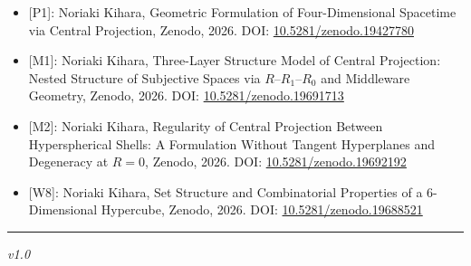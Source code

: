 \documentclass[
  a4paper,11pt]{article}
\providecommand{\tightlist}{%
  \setlength{\itemsep}{0pt}\setlength{\parskip}{0pt}}
\theoremstyle{definition}
\theoremstyle{remark}
\begin{document}
\begin{itemize}
\tightlist
\item
  {[}P1{]}: Noriaki Kihara, Geometric Formulation of Four-Dimensional
  Spacetime via Central Projection, Zenodo, 2026. DOI:
  \href{https://doi.org/10.5281/zenodo.19427780}{10.5281/zenodo.19427780}
\item
  {[}M1{]}: Noriaki Kihara, Three-Layer Structure Model of Central
  Projection: Nested Structure of Subjective Spaces via
  \(R\)--\(R_1\)--\(R_0\) and Middleware Geometry, Zenodo, 2026. DOI:
  \href{https://doi.org/10.5281/zenodo.19691713}{10.5281/zenodo.19691713}
\item
  {[}M2{]}: Noriaki Kihara, Regularity of Central Projection Between
  Hyperspherical Shells: A Formulation Without Tangent Hyperplanes and
  Degeneracy at \(R = 0\), Zenodo, 2026. DOI:
  \href{https://doi.org/10.5281/zenodo.19692192}{10.5281/zenodo.19692192}
\item
  {[}W8{]}: Noriaki Kihara, Set Structure and Combinatorial Properties
  of a 6-Dimensional Hypercube, Zenodo, 2026. DOI:
  \href{https://doi.org/10.5281/zenodo.19688521}{10.5281/zenodo.19688521}
\end{itemize}

\begin{center}\rule{0.5\linewidth}{0.5pt}\end{center}

\emph{v1.0}
\end{document}
